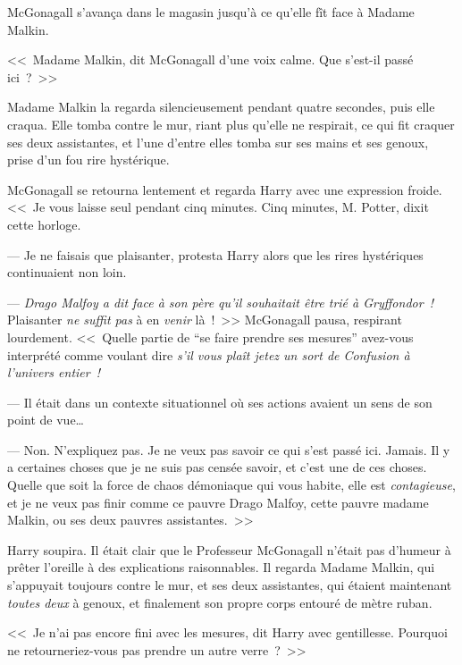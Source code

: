 McGonagall s'avança dans le magasin jusqu'à ce qu'elle fît face à Madame Malkin.

<<~Madame Malkin, dit McGonagall d'une voix calme. Que s'est-il passé ici~?~>>

Madame Malkin la regarda silencieusement pendant quatre secondes, puis elle craqua. Elle tomba contre le mur, riant plus qu'elle ne respirait, ce qui fit craquer ses deux assistantes, et l'une d'entre elles tomba sur ses mains et ses genoux, prise d'un fou rire hystérique.

McGonagall se retourna lentement et regarda Harry avec une expression froide.
<<~Je vous laisse seul pendant cinq minutes. Cinq minutes, M. Potter, dixit cette horloge.

--- Je ne faisais que plaisanter, protesta Harry alors que les rires hystériques continuaient non loin.

--- \emph{Drago Malfoy a dit face à son père qu'il souhaitait être trié à Gryffondor~!} Plaisanter \emph{ne suffit pas} à en \emph{venir} là~!~>> McGonagall pausa, respirant lourdement. <<~Quelle partie de “se faire prendre ses mesures” avez-vous interprété comme voulant dire \emph{s'il vous plaît jetez un sort de Confusion à l'univers entier~!}

--- Il était dans un contexte situationnel où ses actions avaient un sens de son point de vue…

--- Non. N'expliquez pas. Je ne veux pas savoir ce qui s'est passé ici. Jamais. Il y a certaines choses que je ne suis pas censée savoir, et c'est une de ces choses. Quelle que soit la force de chaos démoniaque qui vous habite, elle est \emph{contagieuse}, et je ne veux pas finir comme ce pauvre Drago Malfoy, cette pauvre madame Malkin, ou ses deux pauvres assistantes.~>>

Harry soupira. Il était clair que le Professeur McGonagall n'était pas d'humeur à prêter l'oreille à des explications raisonnables. Il regarda Madame Malkin, qui s'appuyait toujours contre le mur, et ses deux assistantes, qui étaient maintenant \emph{toutes deux} à genoux, et finalement son propre corps entouré de mètre ruban.

<<~Je n'ai pas encore fini avec les mesures, dit Harry avec gentillesse. Pourquoi ne retourneriez-vous pas prendre un autre verre~?~>>

